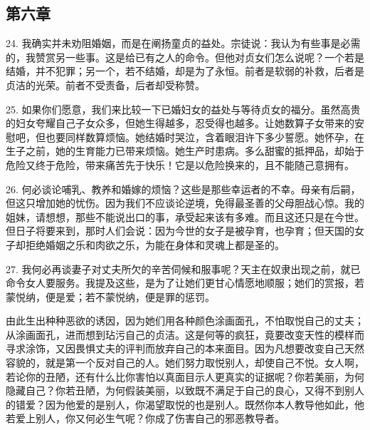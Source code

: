 
\subsection{第六章}

\par

24. 我确实并未劝阻婚姻，而是在阐扬童贞的益处。宗徒说：我认为有些事是必需的，我赞赏另一些事。这是给已有之人的命令。但他对贞女们怎么说呢？一个若是结婚，并不犯罪；另一个，若不结婚，却是为了永恒。前者是软弱的补救，后者是贞洁的光荣。前者不受责备，后者却受称赞。\par

25. 如果你们愿意，我们来比较一下已婚妇女的益处与等待贞女的福分。虽然高贵的妇女夸耀自己子女众多，但她生得越多，忍受得也越多。让她数算子女带来的安慰吧，但也要同样数算烦恼。她结婚时哭泣，含着眼泪许下多少誓愿。她怀孕，在生子之前，她的生育能力已带来烦恼。她生产时患病。多么甜蜜的抵押品，却始于危险又终于危险，带来痛苦先于快乐！它是以危险换来的，且不能随己意拥有。\par

26. 何必谈论哺乳、教养和婚嫁的烦恼？这些是那些幸运者的不幸。母亲有后嗣，但这只增加她的忧伤。因为我们不应谈论逆境，免得最圣善的父母胆战心惊。我的姐妹，请想想，那些不能说出口的事，承受起来该有多难。而且这还只是在今世。但日子将要来到，那时人们会说：因为今世的女子是被孕育，也孕育；但天国的女子却拒绝婚姻之乐和肉欲之乐，为能在身体和灵魂上都是圣的。\par

27. 我何必再谈妻子对丈夫所欠的辛苦伺候和服事呢？天主在奴隶出现之前，就已命令女人要服务。我提及这些，是为了让她们更甘心情愿地顺服；她们的赏报，若蒙悦纳，便是爱；若不蒙悦纳，便是罪的惩罚。\par

由此生出种种恶欲的诱因，因为她们用各种颜色涂画面孔，不怕取悦自己的丈夫；从涂画面孔，进而想到玷污自己的贞洁。这是何等的疯狂，竟要改变天性的模样而寻求涂饰，又因畏惧丈夫的评判而放弃自己的本来面目。因为凡想要改变自己天然容貌的，就是第一个反对自己的人。她们努力取悦别人，却使自己不悦。女人啊，若论你的丑陋，还有什么比你害怕以真面目示人更真实的证据呢？你若美丽，为何隐藏自己？你若丑陋，为何假装美丽，以致既不满足于自己的良心，又得不到别人的错爱？因为他爱的是别人，你渴望取悦的也是别人。既然你本人教导他如此，他若爱上别人，你又何必生气呢？你成了伤害自己的邪恶教导者。\par

